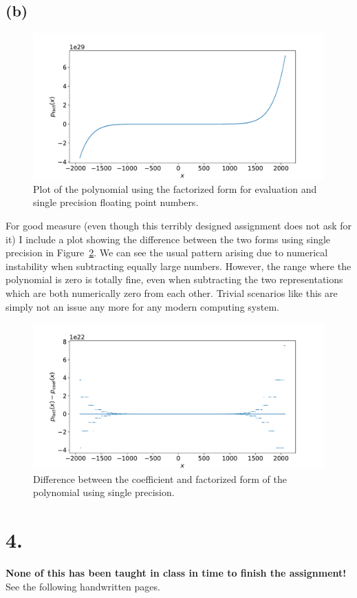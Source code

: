\documentclass[a4paper, 11pt]{article}
\begin{document}
\subsection*{(b)}
\begin{figure}
  \centering
  \includegraphics[width=\textwidth]{../3/b.pdf}
  \caption{Plot of the polynomial using the factorized form for evaluation and
  single precision floating point numbers.}
  \label{fig:3_b}
\end{figure}
For good measure (even though this terribly designed assignment does not ask
for it) I include a plot showing the difference between the two forms using
single precision in Figure~\ref{fig:3_a_b_difference}. We can see the usual
pattern arising due to numerical instability when subtracting equally large
numbers. However, the range where the polynomial is zero is totally fine, even
when subtracting the two representations which are both numerically zero from
each other. Trivial scenarios like this are simply not an issue any more for
any modern computing system.
\begin{figure}[H]
  \centering
  \includegraphics[width=\textwidth]{../3/a_b_diff.pdf}
  \caption{Difference between the coefficient and factorized form of the
  polynomial using single precision.}
  \label{fig:3_a_b_difference}
\end{figure}

\FloatBarrier
\section*{4.}
\textbf{None of this has been taught in class in time to finish the
assignment!}
See the following handwritten pages.



\end{document}
